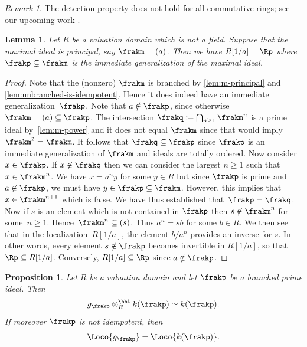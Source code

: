 \documentclass{amsart}
\numberwithin{equation}{section}%
\newtheorem{Prop}[equation]{Proposition}
\newtheorem{Lem}[equation]{Lemma}
\theoremstyle{remark}
\newtheorem{Rem}[equation]{Remark}
\begin{document}
\begin{Rem}
	The detection property does not hold for all commutative rings; see our upcoming work \cite{BarthelHeardSandersZou26pp}.
\end{Rem}

\begin{Lem}\label{lem:for-one-for-all}
	Let $R$ be a valuation domain which is not a field. Suppose that the maximal ideal is principal, say $\frakm = (a)$. Then we have $R[1/a]=\Rp$ where $\frakp \subsetneq \frakm$ is the immediate generalization of the maximal ideal.
\end{Lem}

\begin{proof}
	Note that the (nonzero) $\frakm$ is branched by \cref{lem:m-principal} and \cref{lem:unbranched-is-idempotent}. Hence it does indeed have an immediate generalization~$\frakp$. Note that $a \notin \frakp$, since otherwise $\frakm = (a) \subseteq \frakp$. The intersection $\frakq \coloneqq \bigcap_{n \ge 1}\frakm^n$ is a prime ideal by~\cref{lem:m-power} and it does not equal $\frakm$ since that would imply $\frakm^2=\frakm$. It follows that $\frakq \subseteq \frakp$ since $\frakp$ is an immediate generalization of $\frakm$ and ideals are totally ordered. Now consider~$x\in\frakp$. If $x\not\in\frakq$ then we can consider the largest $n \ge 1$ such that $x\in \frakm^n$. We have $x=a^n y$ for some $y\in R$ but since $\frakp$ is prime and $a \not \in \frakp$, we must have $y \in \frakp \subseteq \frakm$. However, this implies that $x \in \frakm^{n+1}$ which is false. We have thus established that~$\frakp=\frakq$. Now if $s$ is an element which is not contained in $\frakp$ then $s \not\in \frakm^n$ for some~$n \ge 1$. Hence~$\frakm^n \subseteq (s)$. Thus $a^n =s b$ for some $b \in R$. We then see that in the localization~$R[1/a]$, the element $b/a^n$ provides an inverse for $s$. In other words, every element $s \notin \frakp$ becomes invertible in $R[1/a]$, so that $\Rp \subseteq R[1/a]$. Conversely, $R[1/a] \subseteq \Rp$ since $a \notin \frakp$.
\end{proof}

\begin{Prop}\label{prop:gp-kp}
	Let $R$ be a valuation domain and let $\frakp$ be a branched prime ideal. Then
	\begin{equation}\label{eq:gp-tensor-kp}
		g_\frakp \otimes_R^{\bbL} k(\frakp) \simeq k(\frakp).
	\end{equation}
	If moreover $\frakp$ is not idempotent, then
	\begin{equation}\label{eq:gp-kp}
		\Loco{g_\frakp} = \Loco{k(\frakp)}.
	\end{equation}
\end{Prop}
\end{document}
